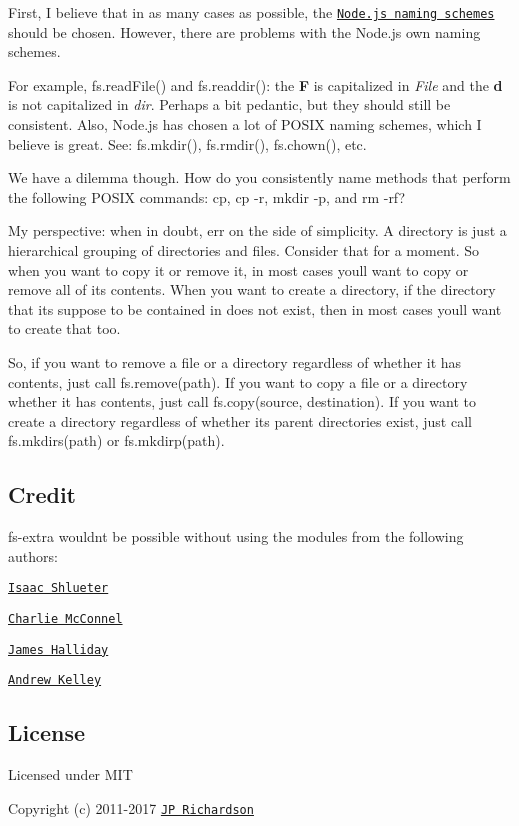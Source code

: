 First, I believe that in as many cases as possible, the \href{http://nodejs.org/api/fs.html}{\tt Node.\+js naming schemes} should be chosen. However, there are problems with the Node.\+js own naming schemes.

For example, {\ttfamily fs.\+read\+File()} and {\ttfamily fs.\+readdir()}\+: the {\bfseries F} is capitalized in {\itshape File} and the {\bfseries d} is not capitalized in {\itshape dir}. Perhaps a bit pedantic, but they should still be consistent. Also, Node.\+js has chosen a lot of P\+O\+S\+IX naming schemes, which I believe is great. See\+: {\ttfamily fs.\+mkdir()}, {\ttfamily fs.\+rmdir()}, {\ttfamily fs.\+chown()}, etc.

We have a dilemma though. How do you consistently name methods that perform the following P\+O\+S\+IX commands\+: {\ttfamily cp}, {\ttfamily cp -\/r}, {\ttfamily mkdir -\/p}, and {\ttfamily rm -\/rf}?

My perspective\+: when in doubt, err on the side of simplicity. A directory is just a hierarchical grouping of directories and files. Consider that for a moment. So when you want to copy it or remove it, in most cases you\textquotesingle{}ll want to copy or remove all of its contents. When you want to create a directory, if the directory that it\textquotesingle{}s suppose to be contained in does not exist, then in most cases you\textquotesingle{}ll want to create that too.

So, if you want to remove a file or a directory regardless of whether it has contents, just call {\ttfamily fs.\+remove(path)}. If you want to copy a file or a directory whether it has contents, just call {\ttfamily fs.\+copy(source, destination)}. If you want to create a directory regardless of whether its parent directories exist, just call {\ttfamily fs.\+mkdirs(path)} or {\ttfamily fs.\+mkdirp(path)}.

\subsection*{Credit }

{\ttfamily fs-\/extra} wouldn\textquotesingle{}t be possible without using the modules from the following authors\+:


\begin{DoxyItemize}
\item \href{https://github.com/isaacs}{\tt Isaac Shlueter}
\item \href{https://github.com/avianflu}{\tt Charlie Mc\+Connel}
\item \href{https://github.com/substack}{\tt James Halliday}
\item \href{https://github.com/andrewrk}{\tt Andrew Kelley}
\end{DoxyItemize}

\subsection*{License }

Licensed under M\+IT

Copyright (c) 2011-\/2017 \href{https://github.com/jprichardson}{\tt JP Richardson} 